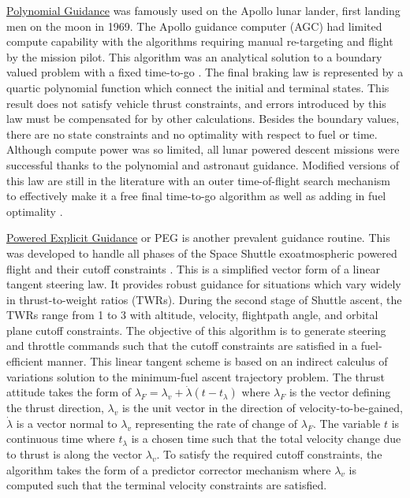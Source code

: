 \underline{Polynomial Guidance} was famously used on the Apollo lunar lander, first landing men on the moon in 1969. The Apollo guidance computer (AGC) had limited compute capability with the algorithms requiring manual re-targeting and flight by the mission pilot. This algorithm was an analytical solution to a boundary valued problem with a fixed time-to-go \cite{klumpp1974apollo}. The final braking law is represented by a quartic polynomial function which connect the initial and terminal states. This result does not satisfy vehicle thrust constraints, and errors introduced by this law must be compensated for by other calculations. Besides the boundary values, there are no state constraints and no optimality with respect to fuel or time. Although compute power was so limited, all lunar powered descent missions were successful thanks to the polynomial and astronaut guidance. Modified versions of this law are still in the literature with an outer time-of-flight search mechanism to effectively make it a free final time-to-go algorithm as well as adding in fuel optimality \cite{d1997optimal}.

\underline{Powered Explicit Guidance} or PEG is another prevalent guidance routine. This was developed to handle all phases of the Space Shuttle exoatmospheric powered flight and their cutoff constraints \cite{mchenry1979space}. This is a simplified vector form of a linear tangent steering law. It provides robust guidance for situations which vary widely in thrust-to-weight ratios (TWRs). During the second stage of Shuttle ascent, the TWRs range from 1 to 3 with altitude, velocity, flightpath angle, and orbital plane cutoff constraints. The objective of this algorithm is to generate steering and throttle commands such that the cutoff constraints are satisfied in a fuel-efficient manner. This linear tangent scheme is based on an indirect calculus of variations solution to the minimum-fuel ascent trajectory problem. The thrust attitude takes the form of $\lambda_F = \lambda_v + \dot{\lambda}(t - t_\lambda)$ where $\lambda_F$ is the vector defining the thrust direction, $\lambda_v$ is the unit vector in the direction of velocity-to-be-gained, $\dot{\lambda}$ is a vector normal to $\lambda_v$ representing the rate of change of $\lambda_F$. The variable $t$ is continuous time where $t_\lambda$ is a chosen time such that the total velocity change due to thrust is along the vector $\lambda_v$. To satisfy the required cutoff constraints, the algorithm takes the form of a predictor corrector mechanism where $\lambda_v$ is computed such that the terminal velocity constraints are satisfied.

